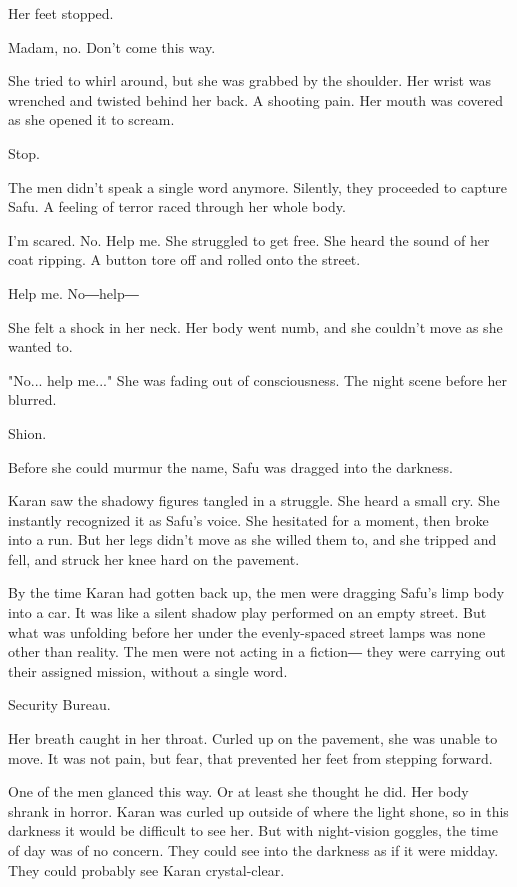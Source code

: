 Her feet stopped.

Madam, no. Don't come this way.

She tried to whirl around, but she was grabbed by the shoulder. Her
wrist was wrenched and twisted behind her back. A shooting pain. Her
mouth was covered as she opened it to scream.

Stop.

The men didn't speak a single word anymore. Silently, they proceeded to
capture Safu. A feeling of terror raced through her whole body.

I'm scared. No. Help me. She struggled to get free. She heard the sound
of her coat ripping. A button tore off and rolled onto the street.

Help me. No―help―

She felt a shock in her neck. Her body went numb, and she couldn't move
as she wanted to.

"No... help me..." She was fading out of consciousness. The night scene
before her blurred.

Shion.

Before she could murmur the name, Safu was dragged into the darkness.

Karan saw the shadowy figures tangled in a struggle. She heard a small
cry. She instantly recognized it as Safu's voice. She hesitated for a
moment, then broke into a run. But her legs didn't move as she willed
them to, and she tripped and fell, and struck her knee hard on the
pavement.

By the time Karan had gotten back up, the men were dragging Safu's limp
body into a car. It was like a silent shadow play performed on an empty
street. But what was unfolding before her under the evenly-spaced street
lamps was none other than reality. The men were not acting in a fiction―
they were carrying out their assigned mission, without a single word.

Security Bureau.

Her breath caught in her throat. Curled up on the pavement, she was
unable to move. It was not pain, but fear, that prevented her feet from
stepping forward.

One of the men glanced this way. Or at least she thought he did. Her
body shrank in horror. Karan was curled up outside of where the light
shone, so in this darkness it would be difficult to see her. But with
night-vision goggles, the time of day was of no concern. They could see
into the darkness as if it were midday. They could probably see Karan
crystal-clear.

